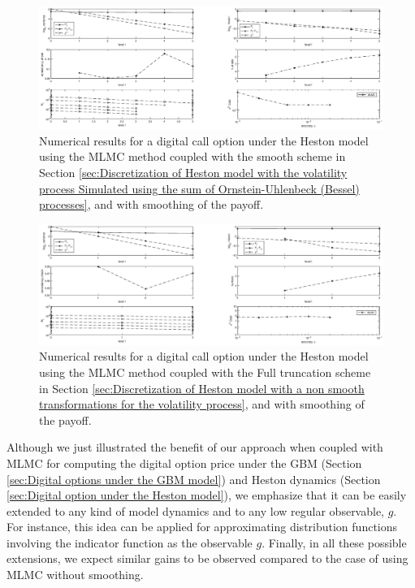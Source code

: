 \FloatBarrier
	\begin{figure}[h!]
\centering
\includegraphics[width=1.2\linewidth]{./figures/MLMC_binary_Heston_opt/with_smoothing/OU/digital_option_set1_L_0_2_steps_L_6}

\caption{Numerical results for a digital call option under the Heston model using the MLMC method coupled with  the smooth   scheme in Section \ref{sec:Discretization of Heston model with the volatility process Simulated using the sum of  Ornstein-Uhlenbeck (Bessel) processes}, and with smoothing of the payoff.}
\label{fig:euler_digital_Heston_with_smoothing_OU}
\end{figure}
\FloatBarrier
	\begin{figure}[h!]
\centering
\includegraphics[width=1.2\linewidth]{./figures/MLMC_binary_Heston_opt/with_smoothing/FT/digital_option_set1_L_0_2_steps_L_4}

\caption{Numerical results for a digital call option under the Heston model using the MLMC method coupled with   the Full truncation scheme in Section \ref{sec:Discretization of Heston model with a non smooth transformations for the volatility process}, and with smoothing of the payoff.}
\label{fig:euler_digital_Heston_with_smoothing_FT}
\end{figure}
\FloatBarrier


\begin{remark}
Although we just illustrated the benefit of our approach when coupled with MLMC for computing the digital option price under the GBM (Section \ref{sec:Digital options under the GBM model}) and Heston dynamics (Section \ref{sec:Digital option under the Heston model}), we emphasize that it can be easily extended to any kind of model dynamics and  to any low regular observable, $g$. For instance, this idea can be applied for approximating distribution functions involving the indicator function as the observable $g$. Finally, in all these possible extensions, we expect similar gains to be observed compared to the case of using MLMC without smoothing.
\end{remark}

